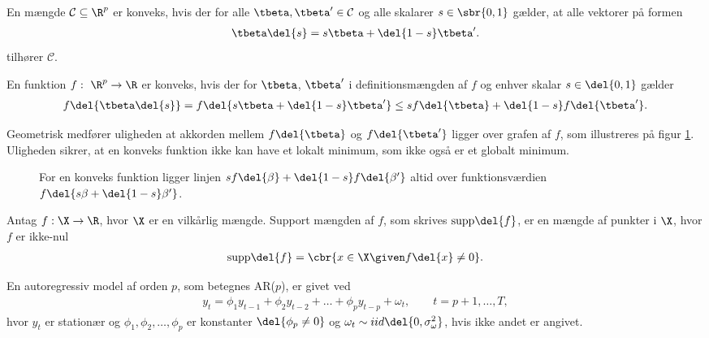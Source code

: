 \begin{defn} \label{defn:konveksm}
En mængde \(\mathcal{C} \subseteq \R^p\) er konveks, hvis der for alle \(\tbeta, \tbeta' \in \mathcal{C}\) og alle skalarer \(s \in \sbr{0,1}\) gælder, at alle vektorer på formen
\begin{align*}
\tbeta \del{s} = s \tbeta + \del{1-s} \tbeta'.
\end{align*}
tilhører \(\mathcal{C}\).
\end{defn}

\begin{defn} \label{defn:konveksfkt}
En funktion \(f: \ \R^p \rightarrow \R\) er konveks, hvis der for \(\tbeta\), \(\tbeta'\) i definitionsmængden af \(f\) og enhver skalar \(s \in \del{0,1}\) gælder
\begin{align*}
f \del{\tbeta \del{s}} = f \del{s \tbeta + \del{1-s} \tbeta'} \leq s f\del{\tbeta} + \del{1-s} f\del{\tbeta'}.
\end{align*}
\end{defn}
Geometrisk medfører uligheden at akkorden mellem \(f \del{\tbeta}\) og  \(f \del{\tbeta'}\) ligger over grafen af \(f\), som illustreres på figur \ref{fig:konveks}.
Uligheden sikrer, at en konveks funktion ikke kan have et lokalt minimum, som ikke også er et globalt minimum.
%
\begin{figure}[H]
\centering
\scalebox{1.2}{}
\caption{For en konveks funktion ligger linjen \(s f \del{\beta} + \del{1-s} f \del{\beta'}\) altid over funktionsværdien \(f \del{s \beta + \del{1-s} \beta'}\).} \label{fig:konveks}
\end{figure}
%
\begin{defn} \label{defn:supp}
Antag \(f: \X \rightarrow \R\), hvor \(\X\) er en vilkårlig mængde.
Support mængden af \(f\), som skrives \(\text{supp} \del{f}\), er en mængde af punkter i \(\X\), hvor \(f\) er ikke-nul
\begin{align*}
\text{supp} \del{f} = \cbr{x \in \X \given f \del{x} \neq 0}.
\end{align*}
\end{defn}
%
\begin{defn} \label{def:ar}
En autoregressiv model af orden $p$, som betegnes AR($p$), er givet ved
\begin{align*}
y_t = \phi_1 y_{t-1} + \phi_2 y_{t-2} + \dots + \phi_p y_{t-p} + \omega_t, \qquad t = p+1, \dots, T,  
\end{align*}
hvor $y_t$ er stationær og $\phi_1 , \phi_2, \dots, \phi_p $ er konstanter  $\del{ \phi_p \neq 0}$ og $\omega_t \sim iid\del{0, \sigma_\omega^2}$, hvis ikke andet er angivet.  
\end{defn}




